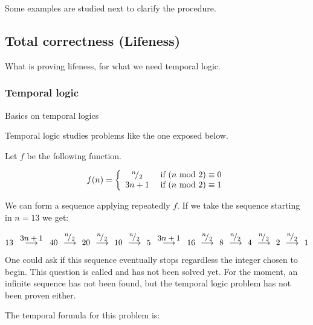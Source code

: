Some examples are studied next to clarify the procedure.

\begin{example}

\end{example}

\begin{example}
\end{example}




\subsection{Total correctness (Lifeness)}

What is proving lifeness, for what we need temporal logic.

\subsubsection{Temporal logic}

Basics on temporal logics

Temporal logic studies problems like the one exposed below.

\begin{example}
\label{Collatz:conjecture}

Let $f$ be the following function.

\[
f(n) = \left\{
	\begin{array}{cc}
		{}^{n}\!/_{2} & \text{ if } (n\text{ mod } 2) \equiv 0\\
		3n+1 & \text{ if } (n\text{ mod } 2) \equiv 1
	\end{array}
\right.
\]

We can form a sequence applying repeatedly $f$. If we take the sequence starting in $n=13$ we get:

\[ 
	13 \overset{\displaystyle\;\; 3n+1\;\;}{\longrightarrow}
	40 \overset{\displaystyle\;\;{}^{n}\!/_{2}\;\;}{\longrightarrow}
	20 \overset{\displaystyle\;\;{}^{n}\!/_{2}\;\;}{\longrightarrow}
	10 \overset{\displaystyle\;\;{}^{n}\!/_{2}\;\;}{\longrightarrow}
	5 \overset{\displaystyle\;\; 3n+1\;\;}{\longrightarrow}
	16 \overset{\displaystyle\;\;{}^{n}\!/_{2}\;\;}{\longrightarrow}
	8 \overset{\displaystyle\;\;{}^{n}\!/_{2}\;\;}{\longrightarrow}
	4 \overset{\displaystyle\;\;{}^{n}\!/_{2}\;\;}{\longrightarrow}
	2 \overset{\displaystyle\;\;{}^{n}\!/_{2}\;\;}{\longrightarrow}
	1
\]

One could ask if this sequence eventually stops regardless the integer chosen to begin. This question is called  and has not been solved yet. 
For the moment, an infinite sequence has not been found, but the temporal logic problem has not been proven either.

The temporal formula for this problem is:



\end{example}


